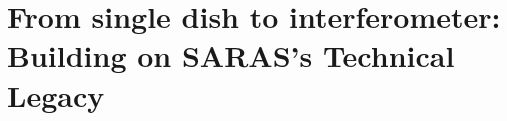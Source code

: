 \documentclass[12pt]{amsart}
\begin{document}





\vspace{-.2in}
\section{From single dish to interferometer: Building on SARAS's Technical Legacy}
\label{sec:instrument}
\end{document}
